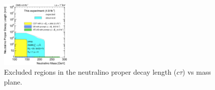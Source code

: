 \documentclass[twocolumn,twoside,10pt,nodate]{article}
\begin{document}
\begin{figure}[h]
\centering
\includegraphics[width=0.30\textwidth,angle=0]{santanastasio_fig2.png}
\caption{\small Excluded regions in the neutralino proper decay length
  ($c\tau$) vs mass plane.} %
\end{figure}


\end{document}
